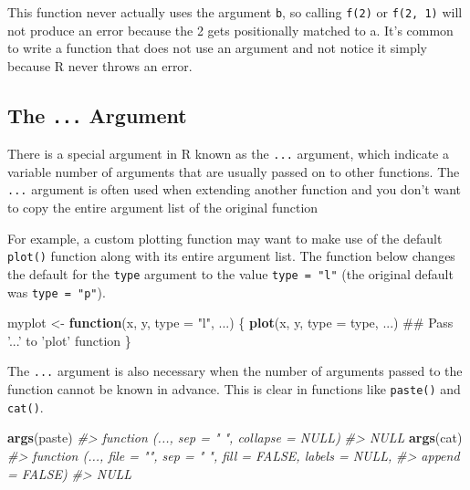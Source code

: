 \documentclass[]{book}
\newenvironment{Shaded}{\begin{snugshade}}{\end{snugshade}}
\newcommand{\KeywordTok}[1]{\textcolor[rgb]{0.13,0.29,0.53}{\textbf{#1}}}
\newcommand{\DataTypeTok}[1]{\textcolor[rgb]{0.13,0.29,0.53}{#1}}
\newcommand{\StringTok}[1]{\textcolor[rgb]{0.31,0.60,0.02}{#1}}
\newcommand{\CommentTok}[1]{\textcolor[rgb]{0.56,0.35,0.01}{\textit{#1}}}
\newcommand{\ControlFlowTok}[1]{\textcolor[rgb]{0.13,0.29,0.53}{\textbf{#1}}}
\newcommand{\NormalTok}[1]{#1}
\theoremstyle{definition}
\theoremstyle{definition}
\theoremstyle{definition}
\theoremstyle{remark}
\begin{document}
This function never actually uses the argument \texttt{b}, so calling
\texttt{f(2)} or \texttt{f(2,\ 1)} will not produce an error because the
2 gets positionally matched to a. It's common to write a function that
does not use an argument and not notice it simply because R never throws
an error.

\subsection{\texorpdfstring{The \texttt{...}
Argument}{The ... Argument}}\label{the-...-argument}

There is a special argument in R known as the \texttt{...} argument,
which indicate a variable number of arguments that are usually passed on
to other functions. The \texttt{...} argument is often used when
extending another function and you don't want to copy the entire
argument list of the original function

For example, a custom plotting function may want to make use of the
default \texttt{plot()} function along with its entire argument list.
The function below changes the default for the \texttt{type} argument to
the value \texttt{type\ =\ "l"} (the original default was
\texttt{type\ =\ "p"}).

\begin{Shaded}
\begin{Highlighting}[]
\NormalTok{myplot <-}\StringTok{ }\ControlFlowTok{function}\NormalTok{(x, y, }\DataTypeTok{type =} \StringTok{"l"}\NormalTok{, ...) \{}
        \KeywordTok{plot}\NormalTok{(x, y, }\DataTypeTok{type =}\NormalTok{ type, ...)         ## Pass '...' to 'plot' function}
\NormalTok{\}}
\end{Highlighting}
\end{Shaded}

The \texttt{...} argument is also necessary when the number of arguments
passed to the function cannot be known in advance. This is clear in
functions like \texttt{paste()} and \texttt{cat()}.

\begin{Shaded}
\begin{Highlighting}[]
\KeywordTok{args}\NormalTok{(paste)}
\CommentTok{#> function (..., sep = " ", collapse = NULL) }
\CommentTok{#> NULL}
\KeywordTok{args}\NormalTok{(cat)}
\CommentTok{#> function (..., file = "", sep = " ", fill = FALSE, labels = NULL, }
\CommentTok{#>     append = FALSE) }
\CommentTok{#> NULL}
\end{Highlighting}
\end{Shaded}
\end{document}
